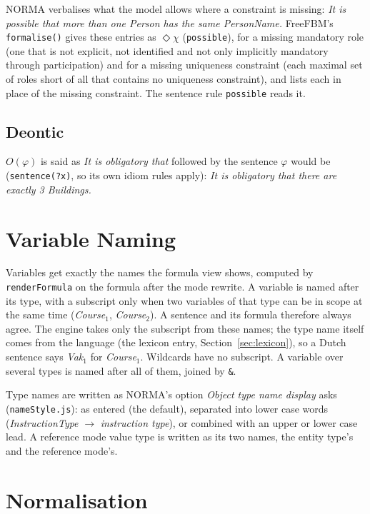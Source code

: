 \documentclass[11pt, a4paper]{article}
\newcommand{\code}[1]{\texttt{\color{codefg}#1}}
\begin{document}
NORMA verbalises what the model allows where a constraint is missing:
\textit{It is possible that more than one Person has the same PersonName.}
FreeFBM's \code{formalise()} gives these entries as $\Diamond\chi$
(\code{possible}), for a missing mandatory role (one that is not explicit,
not identified and not only implicitly mandatory through participation) and
for a missing uniqueness constraint (each maximal set of roles short of all
that contains no uniqueness constraint), and lists each in place of the
missing constraint. The sentence rule \code{possible} reads it.

\subsection{Deontic}

$O(\varphi)$ is said as \textit{It is obligatory that} followed by the
sentence $\varphi$ would be (\code{sentence(?x)}, so its own idiom rules
apply): \textit{It is obligatory that there are exactly 3 Buildings.}

\section{Variable Naming}

Variables get exactly the names the formula view shows, computed by
\code{renderFormula} on the formula after the mode rewrite. A variable is
named after its type, with a subscript only when two variables of that type
can be in scope at the same time (\textit{Course}$_1$, \textit{Course}$_2$).
A sentence and its formula therefore always agree. The engine takes only the
subscript from these names; the type name itself comes from the language
(the lexicon entry, Section~\ref{sec:lexicon}), so a Dutch sentence says
\textit{Vak}$_1$ for \textit{Course}$_1$. Wildcards have no subscript. A
variable over several types is named after all of them, joined by \code{\&}.

Type names are written as NORMA's option \textit{Object type name display}
asks (\code{nameStyle.js}): as entered (the default), separated into lower
case words (\textit{InstructionType} $\to$ \textit{instruction type}), or
combined with an upper or lower case lead. A reference mode value type is
written as its two names, the entity type's and the reference mode's.

\section{Normalisation}
\label{sec:normalisation}
\end{document}
